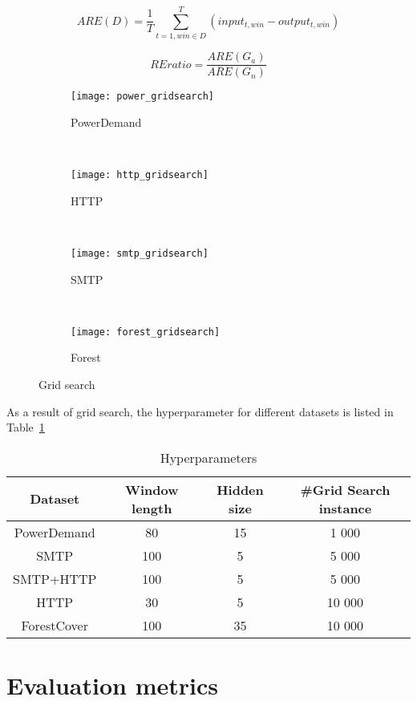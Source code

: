 \begin{equation}\label{eq:are}
ARE(D) = \frac{1}{T}\sum_{t=1,win\in D}^{T}(input_{t,win}-output_{t,win})
\end{equation}

\begin{equation}\label{eq:ratio}
REratio=\frac{ARE(G_a)}{ARE(G_n)}
\end{equation}

\begin{figure}[h]
\centering
	\begin {subfigure}[t]{0.45\textwidth}
	\centering
	\texttt{[image: power\_gridsearch]}
	\caption{PowerDemand}
	\label{fig:power}
	\end{subfigure}
	~
	\begin {subfigure}[t]{0.45\textwidth}
	\centering
	\texttt{[image: http\_gridsearch]}
	\caption{HTTP}
	\label{fig:http}
	\end{subfigure}
	~
	\begin {subfigure}[t]{0.45\textwidth}
	\centering
	\texttt{[image: smtp\_gridsearch]}
	\caption{SMTP}
	\label{fig:smtp}
	\end{subfigure}
	~
	\begin {subfigure}[t]{0.45\textwidth}
	\centering
	\texttt{[image: forest\_gridsearch]}
	\caption{Forest}
	\label{fig:forest}
	\end{subfigure}

	\caption[Grid search]{Grid search}
\label{fig:gridsearch}
\end{figure}

As a result of grid search, the hyperparameter for different datasets is listed in Table~\ref{tab:hyper}

\begin{table}[h] 
\caption{Hyperparameters} 
\centering      
\begin{tabular}{c c c c}  
\hline\hline        
Dataset & Window length & Hidden size & \#Grid Search instance \\ [0.5ex] 
\hline 
PowerDemand & 80 & 15 & 1 000 \\  
SMTP & 100 & 5 &  5 000 \\ 
SMTP+HTTP & 100 & 5 & 5 000 \\ 
HTTP & 30 & 5  &  10 000 \\ 
ForestCover & 100 & 35 & 10 000 \\ [1ex]  
\hline    
\end{tabular}
\label{tab:hyper}  
\end{table} 


\section{Evaluation metrics}
\label{evaluation}











